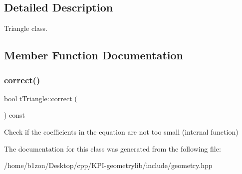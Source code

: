 \subsection{Detailed Description}
Triangle class. 

\subsection{Member Function Documentation}
\mbox{\label{classtTriangle_a21ecf9d970912497eca5009d6965aa54}} 
\subsubsection{\texorpdfstring{correct()}{correct()}}
{\footnotesize\ttfamily bool t\+Triangle\+::correct (\begin{DoxyParamCaption}{ }\end{DoxyParamCaption}) const}

Check if the coefficients in the equation are not too small (internal function) 

The documentation for this class was generated from the following file\+:\begin{DoxyCompactItemize}
\item 
/home/b1zon/\+Desktop/cpp/\+K\+P\+I-\/geometrylib/include/geometry.\+hpp\end{DoxyCompactItemize}
